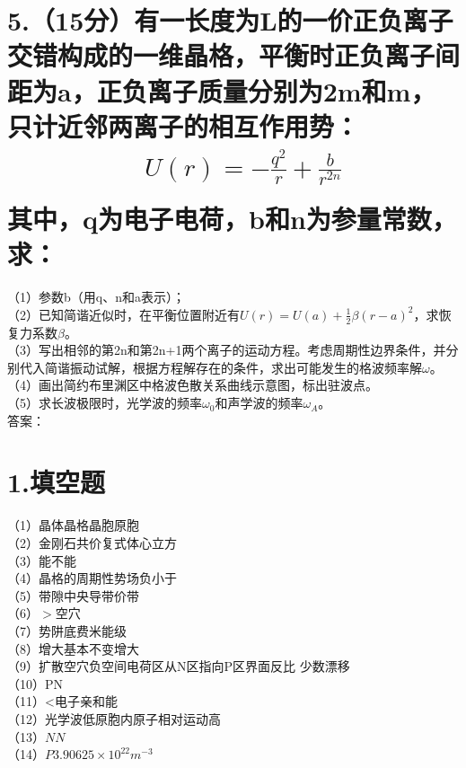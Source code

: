\documentclass[UTF8]{ctexart}
\begin{document}
\section*{5.（15分）有一长度为L的一价正负离子交错构成的一维晶格，平衡时正负离子间距为a，正负离子质量分别为2m和m，只计近邻两离子的相互作用势：
\begin{equation*}
    \begin{aligned}
        & U(r)=-\frac{q^2}{r}+\frac{b}{r^{2n}}\\
    \end{aligned}
\end{equation*}
其中，q为电子电荷，b和n为参量常数，求：}
（1）参数b（用q、n和a表示）；\\
（2）已知简谐近似时，在平衡位置附近有$U(r)=U(a)+\frac{1}{2}\beta(r-a)^2$，求恢复力系数$\beta$。\\
（3）写出相邻的第2n和第2n+1两个离子的运动方程。考虑周期性边界条件，并分别代入简谐振动试解，根据方程解存在的条件，求出可能发生的格波频率解$\omega$。\\
（4）画出简约布里渊区中格波色散关系曲线示意图，标出驻波点。\\
（5）求长波极限时，光学波的频率$\omega_0$和声学波的频率$\omega_A$。\\


答案：\\
\section*{1.填空题}
（1）晶体晶格晶胞原胞\\
（2）金刚石共价复式体心立方\\
（3）能不能\\
（4）晶格的周期性势场负小于\\
（5）带隙中央导带价带\\
（6）$>$空穴\\
（7）势阱底费米能级\\
（8）增大基本不变增大\\
（9）扩散空穴负空间电荷区从N区指向P区界面反比
少数漂移\\
（10）PN\\
（11）<电子亲和能\\
（12）光学波低原胞内原子相对运动高\\
（13）$N$$N$\\
（14）$P$$3.90625\times10^{22}m^{-3}$\\
\end{document}

